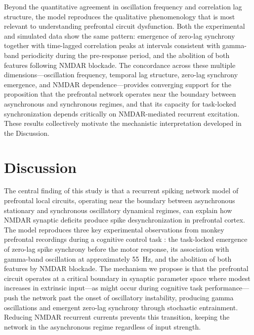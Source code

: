 \documentclass[10pt]{article}
\begin{document}
Beyond the quantitative agreement in oscillation frequency and correlation lag structure, the model reproduces the qualitative phenomenology that is most relevant to understanding prefrontal circuit dysfunction. Both the experimental and simulated data show the same pattern: emergence of zero-lag synchrony together with time-lagged correlation peaks at intervals consistent with gamma-band periodicity during the pre-response period, and the abolition of both features following NMDAR blockade. The concordance across these multiple dimensions---oscillation frequency, temporal lag structure, zero-lag synchrony emergence, and NMDAR dependence---provides converging support for the proposition that the prefrontal network operates near the boundary between asynchronous and synchronous regimes, and that its capacity for task-locked synchronization depends critically on NMDAR-mediated recurrent excitation. These results collectively motivate the mechanistic interpretation developed in the Discussion.

\section{Discussion}

The central finding of this study is that a recurrent spiking network model of prefrontal local circuits, operating near the boundary between asynchronous stationary and synchronous oscillatory dynamical regimes, can explain how NMDAR synaptic deficits produce spike desynchronization in prefrontal cortex. The model reproduces three key experimental observations from monkey prefrontal recordings during a cognitive control task \citep{zick2018blocking}: the task-locked emergence of zero-lag spike synchrony before the motor response, its association with gamma-band oscillation at approximately 55~Hz, and the abolition of both features by NMDAR blockade. The mechanism we propose is that the prefrontal circuit operates at a critical boundary in synaptic parameter space where modest increases in extrinsic input---as might occur during cognitive task performance---push the network past the onset of oscillatory instability, producing gamma oscillations and emergent zero-lag synchrony through stochastic entrainment. Reducing NMDAR recurrent currents prevents this transition, keeping the network in the asynchronous regime regardless of input strength.
\end{document}
